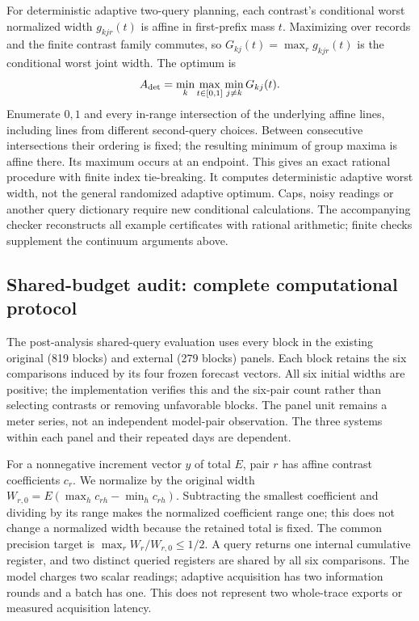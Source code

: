 For deterministic adaptive two-query planning, each contrast's conditional
worst normalized width $g_{kjr}(t)$ is affine in first-prefix mass $t$.
Maximizing over records and the finite contrast family commutes, so
$G_{kj}(t)=\max_r g_{kjr}(t)$ is the conditional worst joint width. The optimum is
\[
 A_{\rm det}=\min_k\max_{t\in[0,1]}\min_{j\ne k}G_{kj}(t).
\]
Enumerate $0,1$ and every in-range intersection of the underlying affine
lines, including lines from different second-query choices. Between
consecutive intersections their ordering is fixed; the resulting
minimum of group maxima is affine there. Its maximum occurs at an endpoint.
This gives an exact rational procedure with finite index tie-breaking.
It computes deterministic adaptive worst width, not the general randomized
adaptive optimum. Caps, noisy readings or another query dictionary require
new conditional calculations. The accompanying checker reconstructs all
example certificates with rational arithmetic; finite checks supplement
the continuum arguments above.

\subsection{Shared-budget audit: complete computational protocol}
\label{sec:joint_shared_protocol}
The post-analysis shared-query evaluation uses every block in the existing
original (819 blocks) and external (279 blocks) panels. Each block retains the
six comparisons induced by its four frozen forecast vectors. All six initial
widths are positive; the implementation verifies this and the six-pair count
rather than selecting contrasts or removing unfavorable blocks. The panel
unit remains a meter series, not an independent model-pair observation. The
three systems within each panel and their repeated days are dependent.

For a nonnegative increment vector $y$ of total $E$, pair $r$ has affine
contrast coefficients $c_r$. We normalize by the original width
$W_{r,0}=E(\max_hc_{rh}-\min_hc_{rh})$. Subtracting the smallest coefficient
and dividing by its range makes the normalized coefficient range one; this
does not change a normalized width because the retained total is fixed.
The common precision target is $\max_r W_r/W_{r,0}\leq1/2$. A query returns
one internal cumulative register, and two distinct queried registers are
shared by all six comparisons. The model charges two scalar readings;
adaptive acquisition has two information rounds and a batch has one. This
does not represent two whole-trace exports or measured acquisition latency.

